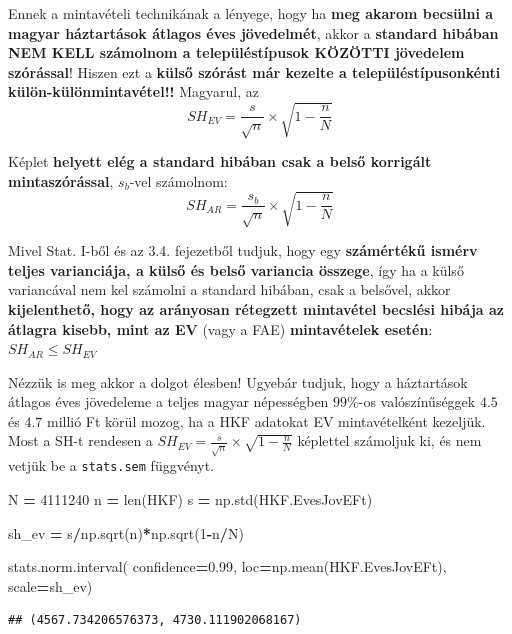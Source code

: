 \documentclass[
]{book}
\newenvironment{Shaded}{\begin{snugshade}}{\end{snugshade}}
\newcommand{\BuiltInTok}[1]{#1}
\newcommand{\DecValTok}[1]{\textcolor[rgb]{0.00,0.00,0.81}{#1}}
\newcommand{\FloatTok}[1]{\textcolor[rgb]{0.00,0.00,0.81}{#1}}
\newcommand{\NormalTok}[1]{#1}
\newcommand{\OperatorTok}[1]{\textcolor[rgb]{0.81,0.36,0.00}{\textbf{#1}}}
\begin{document}
Ennek a mintavételi technikának a lényege, hogy ha \textbf{meg akarom becsülni a magyar háztartások átlagos éves jövedelmét}, akkor a \textbf{standard hibában NEM KELL számolnom a településtípusok KÖZÖTTI jövedelem szórással}! Hiszen ezt a \textbf{külső szórást már kezelte a településtípusonkénti külön-különmintavétel!!}
Magyarul, az \[SH_{EV} = \frac{s}{\sqrt{n}} \times \sqrt{1-\frac{n}{N}}\]

Képlet \textbf{helyett elég a standard hibában csak a belső korrigált mintaszórással}, \(s_b\)-vel számolnom: \[SH_{AR} = \frac{s_b}{\sqrt{n}} \times \sqrt{1-\frac{n}{N}}\]

Mivel Stat. I-ből és az 3.4. fejezetből tudjuk, hogy egy \textbf{számértékű ismérv teljes varianciája, a külső és belső variancia összege}, így ha a külső variancával nem kel számolni a standard hibában, csak a belsővel, akkor \textbf{kijelenthető, hogy az arányosan rétegzett mintavétel becslési hibája az átlagra kisebb, mint az EV} (vagy a FAE) \textbf{mintavételek esetén}: \(SH_{AR} \leq SH_{EV}\)

Nézzük is meg akkor a dolgot élesben! Ugyebár tudjuk, hogy a háztartások átlagos éves jövedeleme a teljes magyar népességben \(99\%\)-os valószínűséggek \(4.5\) és \(4.7\) millió Ft körül mozog, ha a HKF adatokat EV mintavételként kezeljük. Most a SH-t rendesen a \(SH_{EV}=\frac{s}{\sqrt{n}} \times \sqrt{1-\frac{n}{N}}\) képlettel számoljuk ki, és nem vetjük be a \texttt{stats.sem} függvényt.

\begin{Shaded}
\begin{Highlighting}[]
\NormalTok{N }\OperatorTok{=} \DecValTok{4111240}
\NormalTok{n }\OperatorTok{=} \BuiltInTok{len}\NormalTok{(HKF)}
\NormalTok{s }\OperatorTok{=}\NormalTok{ np.std(HKF.EvesJovEFt)}

\NormalTok{sh\_ev }\OperatorTok{=}\NormalTok{ s}\OperatorTok{/}\NormalTok{np.sqrt(n)}\OperatorTok{*}\NormalTok{np.sqrt(}\DecValTok{1}\OperatorTok{{-}}\NormalTok{n}\OperatorTok{/}\NormalTok{N)}

\NormalTok{stats.norm.interval(}
\NormalTok{  confidence}\OperatorTok{=}\FloatTok{0.99}\NormalTok{,}
\NormalTok{  loc}\OperatorTok{=}\NormalTok{np.mean(HKF.EvesJovEFt),}
\NormalTok{  scale}\OperatorTok{=}\NormalTok{sh\_ev)}
\end{Highlighting}
\end{Shaded}

\begin{verbatim}
## (4567.734206576373, 4730.111902068167)
\end{verbatim}
\end{document}

